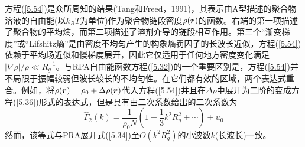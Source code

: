 方程(\ref{5.54})是众所周知的结果(Tang和Freed，1991)，其表示由A型描述的聚合物溶液的自由能(以$k_BT$为单位)作为聚合物链段密度$\rho(\bm{r})$的函数。右端的第一项描述了聚合物的平均熵，而第二项描述了溶剂介导的链段相互作用。第三个“渐变梯度”或“Lifshitz熵”是由密度不均匀产生的构象熵罚因子的长波长近似，方程(\ref{5.54})依赖于平均场近似和慢梯度展开，因此它仅适用于任何地方密度变化满足$\left|\nabla\rho\right|/\rho\ll R_g^{-1}$。与RPA自由能函数方程(\ref{5.32})的一个重要区别是，方程(\ref{5.54})并不局限于振幅较弱但波长较长的不均匀性。在它们都有效的区域，两个表达式重合。例如，将$\rho(\bm{r})=\rho_0+\Delta\rho(\bm{r})$代入方程(\ref{5.54})并且在$\Delta\rho$中展开为二阶的变成方程(\ref{5.36})形式的表达式，但是具有由二次系数给出的二次系数为
\begin{equation}
\hat{\Gamma}_2(k)=\frac{1}{\rho_0N}\left(1+\frac{1}{3}k^2R_g^2+\cdots\right)+u_0
\end{equation}
然而，该等式与PRA展开式(\ref{5.34})至$O(k^2R_g^2)$的小波数$k$(长波长)一致。


























